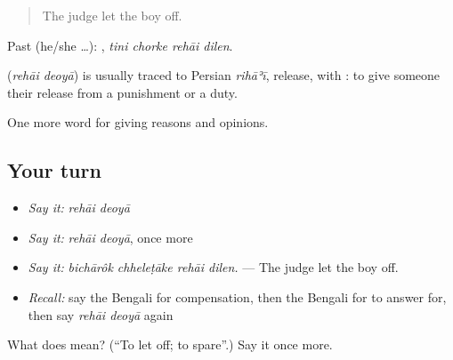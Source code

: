 \begin{quote}
The judge let the boy off.
\end{quote}

Past (he/she …):    , \emph{tini chorke rehāi dilen}.

\begin{cousinweb}
\textbf{ } (\emph{rehāi deoyā}) is usually traced to Persian \emph{rihāʾī}, release, with : to give someone their release from a punishment or a duty.
\end{cousinweb}

\begin{grammarlens}[title={What you've built}]
One more word for giving reasons and opinions.
\end{grammarlens}

\subsection*{Your turn}
\begin{itemize}
\raggedright
  \item \emph{Say it:} \emph{rehāi deoyā}
  \item \emph{Say it:} \emph{rehāi deoyā}, once more
  \item \emph{Say it:} \emph{bichārôk chheleṭāke rehāi dilen.} — The judge let the boy off.
  \item \emph{Recall:} say the Bengali for compensation, then the Bengali for to answer for, then say \emph{rehāi deoyā} again
\end{itemize}

\begin{tcolorbox}[breakable,colback=teal!4,colframe=teal!35!black,title={Before you move on}]
What does   mean? (\textquotedblleft{}To let off; to spare\textquotedblright{}.) Say it once more.
\end{tcolorbox}
